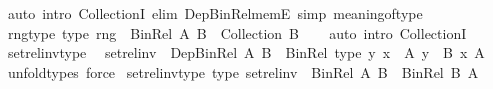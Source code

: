 \begin{isabellebody}
\isamarkupfalse%
\ {\isacharparenleft}{\kern0pt}auto\ intro{\isacharbang}{\kern0pt}{\isacharcolon}{\kern0pt}\ CollectionI\ elim{\isacharbang}{\kern0pt}{\isacharcolon}{\kern0pt}\ Dep{\isacharunderscore}{\kern0pt}Bin{\isacharunderscore}{\kern0pt}Rel{\isacharunderscore}{\kern0pt}memE\ simp{\isacharcolon}{\kern0pt}\ meaning{\isacharunderscore}{\kern0pt}of{\isacharunderscore}{\kern0pt}type{\isacharparenright}{\kern0pt}%
\endisatagproof
{\isafoldproof}%
%
\isadelimproof
\isanewline
%
\endisadelimproof
\isanewline
{}\isamarkupfalse%
\ rng{\isacharunderscore}{\kern0pt}type{\isacharprime}{\kern0pt}\ {\isacharbrackleft}{\kern0pt}type{\isacharbrackright}{\kern0pt}{\isacharcolon}{\kern0pt}\ {\isachardoublequoteopen}rng\ {\isacharcolon}{\kern0pt}\ Bin{\isacharunderscore}{\kern0pt}Rel\ A\ B\ {\isasymRightarrow}\ Collection\ B{\isachardoublequoteclose}\isanewline
%
\isadelimproof
\ \ %
\endisadelimproof
%
\isatagproof
{}\isamarkupfalse%
\ {\isacharparenleft}{\kern0pt}auto\ intro{\isacharcolon}{\kern0pt}\ CollectionI{\isacharparenright}{\kern0pt}%
\endisatagproof
{\isafoldproof}%
%
\isadelimproof
\isanewline
%
\endisadelimproof
\isanewline
{}\isamarkupfalse%
\ set{\isacharunderscore}{\kern0pt}rel{\isacharunderscore}{\kern0pt}inv{\isacharunderscore}{\kern0pt}type{\isacharcolon}{\kern0pt}\isanewline
\ \ {\isachardoublequoteopen}set{\isacharunderscore}{\kern0pt}rel{\isacharunderscore}{\kern0pt}inv\ {\isacharcolon}{\kern0pt}\ Dep{\isacharunderscore}{\kern0pt}Bin{\isacharunderscore}{\kern0pt}Rel\ A\ B\ {\isasymRightarrow}\ Bin{\isacharunderscore}{\kern0pt}Rel\ {\isacharparenleft}{\kern0pt}type\ {\isacharparenleft}{\kern0pt}{\isasymlambda}y{\isachardot}{\kern0pt}\ {\isasymexists}x\ {\isacharcolon}{\kern0pt}\ A{\isachardot}{\kern0pt}\ y\ {\isacharcolon}{\kern0pt}\ B\ x{\isacharparenright}{\kern0pt}{\isacharparenright}{\kern0pt}\ A{\isachardoublequoteclose}\isanewline
%
\isadelimproof
\ \ %
\endisadelimproof
%
\isatagproof
{}\isamarkupfalse%
\ unfold{\isacharunderscore}{\kern0pt}types\ force%
\endisatagproof
{\isafoldproof}%
%
\isadelimproof
\isanewline
%
\endisadelimproof
\isanewline
{}\isamarkupfalse%
\ set{\isacharunderscore}{\kern0pt}rel{\isacharunderscore}{\kern0pt}inv{\isacharunderscore}{\kern0pt}type{\isacharprime}{\kern0pt}\ {\isacharbrackleft}{\kern0pt}type{\isacharbrackright}{\kern0pt}{\isacharcolon}{\kern0pt}\ {\isachardoublequoteopen}set{\isacharunderscore}{\kern0pt}rel{\isacharunderscore}{\kern0pt}inv\ {\isacharcolon}{\kern0pt}\ Bin{\isacharunderscore}{\kern0pt}Rel\ A\ B\ {\isasymRightarrow}\ Bin{\isacharunderscore}{\kern0pt}Rel\ B\ A{\isachardoublequoteclose}\isanewline

\end{isabellebody}
